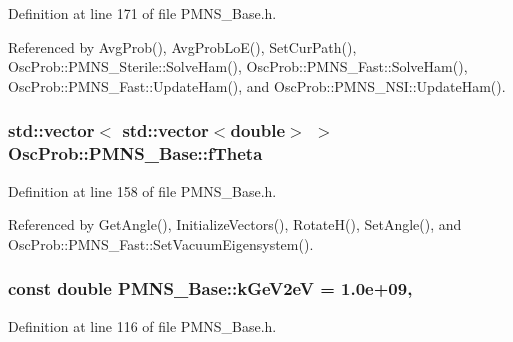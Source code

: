 Definition at line 171 of file P\+M\+N\+S\+\_\+\+Base.\+h.



Referenced by Avg\+Prob(), Avg\+Prob\+Lo\+E(), Set\+Cur\+Path(), Osc\+Prob\+::\+P\+M\+N\+S\+\_\+\+Sterile\+::\+Solve\+Ham(), Osc\+Prob\+::\+P\+M\+N\+S\+\_\+\+Fast\+::\+Solve\+Ham(), Osc\+Prob\+::\+P\+M\+N\+S\+\_\+\+Fast\+::\+Update\+Ham(), and Osc\+Prob\+::\+P\+M\+N\+S\+\_\+\+N\+S\+I\+::\+Update\+Ham().

\subsubsection[{\texorpdfstring{f\+Theta}{fTheta}}]{\setlength{\rightskip}{0pt plus 5cm}std\+::vector$<$ std\+::vector$<$double$>$ $>$ Osc\+Prob\+::\+P\+M\+N\+S\+\_\+\+Base\+::f\+Theta\hspace{0.3cm}{\ttfamily [protected]}}\hypertarget{classOscProb_1_1PMNS__Base_a1976887cd658dd86b2336c181f1470b4}{}\label{classOscProb_1_1PMNS__Base_a1976887cd658dd86b2336c181f1470b4}


Definition at line 158 of file P\+M\+N\+S\+\_\+\+Base.\+h.



Referenced by Get\+Angle(), Initialize\+Vectors(), Rotate\+H(), Set\+Angle(), and Osc\+Prob\+::\+P\+M\+N\+S\+\_\+\+Fast\+::\+Set\+Vacuum\+Eigensystem().

\subsubsection[{\texorpdfstring{k\+Ge\+V2eV}{kGeV2eV}}]{\setlength{\rightskip}{0pt plus 5cm}const double P\+M\+N\+S\+\_\+\+Base\+::k\+Ge\+V2eV = 1.\+0e+09\hspace{0.3cm}{\ttfamily [static]}, {\ttfamily [protected]}}\hypertarget{classOscProb_1_1PMNS__Base_ad36a0a6bf58d6ec093d3947784bd89e9}{}\label{classOscProb_1_1PMNS__Base_ad36a0a6bf58d6ec093d3947784bd89e9}


Definition at line 116 of file P\+M\+N\+S\+\_\+\+Base.\+h.



